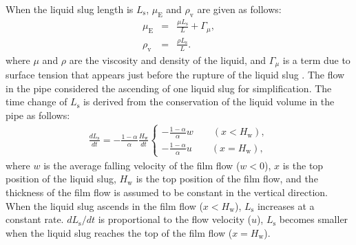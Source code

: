 \documentclass[aps,pre,preprint,groupedaddress,showkeys]{revtex4-2}
\begin{document}
When the liquid slug length is $L_ \mathrm{s}$, $\mu_\mathrm{E}$ and $\rho_\mathrm{v}$ are given as follows:
\begin{eqnarray}
\mu_\mathrm{E} &=& \frac{\mu L_\mathrm{s}}{L} + \Gamma_\mu \label{mue},\\
\rho_\mathrm{v} &=& \frac{\rho L_\mathrm{s}}{L}. \label{rhov}
\end{eqnarray}
where $\mu$ and $\rho$ are the viscosity and density of the liquid, and $\Gamma_ \mu$ is a term due to surface tension that appears just before the rupture of the liquid slug \citep{kanno2018}.
The flow in the pipe considered the ascending of one liquid slug for simplification.
The time change of $L_\mathrm{s}$ is derived from the conservation of the liquid volume in the pipe as follows:
\begin{eqnarray}
\frac{dL_\mathrm{s}}{dt}= - \frac{1-\alpha}{\alpha} \frac{H_\mathrm{w}}{dt} \left\{
  \begin{array}{ll}
  -\frac{1-\alpha}{\alpha} w \qquad (x<H_\mathrm{w}), \\
   -\frac{1-\alpha}{\alpha} u \qquad (x=H_\mathrm{w}),
  \end{array}
  \right. 
  \label{dLdt}
\end{eqnarray}
where $ w $ is the average falling velocity of the film flow ($ w <0 $), $ x $ is the top position of the liquid slug, $ H_ \mathrm {w} $ is the top position of the film flow, and the thickness of the film flow is assumed to be constant in the vertical direction.
When the liquid slug ascends in the film flow ($ x <H_ \mathrm{w} $), $ L_ \mathrm{s} $ increases at a constant rate.
$ dL_ \mathrm{s} / dt $ is proportional to the flow velocity ($ u $), $ L_ \mathrm{s} $ becomes smaller when the liquid slug reaches the top of the film flow ($ x = H_ \mathrm{w}$).
\end{document}

